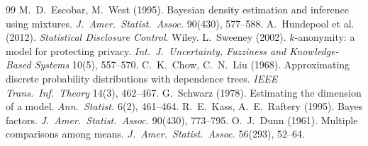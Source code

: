 \documentclass[11pt,a4paper]{article}
\theoremstyle{definition}
\theoremstyle{remark}
\begin{document}
\begin{thebibliography}{99}
 M.~D.~Escobar, M.~West (1995). Bayesian density estimation and inference using mixtures. \emph{J.\ Amer.\ Statist.\ Assoc.} 90(430), 577--588.
 A.~Hundepool et al. (2012). \emph{Statistical Disclosure Control}. Wiley.
 L.~Sweeney (2002). $k$-anonymity: a model for protecting privacy. \emph{Int.\ J.\ Uncertainty, Fuzziness and Knowledge-Based Systems} 10(5), 557--570.
 C.~K.~Chow, C.~N.~Liu (1968). Approximating discrete probability distributions with dependence trees. \emph{IEEE Trans.\ Inf.\ Theory} 14(3), 462--467.
 G.~Schwarz (1978). Estimating the dimension of a model. \emph{Ann.\ Statist.} 6(2), 461--464.
 R.~E.~Kass, A.~E.~Raftery (1995). Bayes factors. \emph{J.\ Amer.\ Statist.\ Assoc.} 90(430), 773--795.
 O.~J.~Dunn (1961). Multiple comparisons among means. \emph{J.\ Amer.\ Statist.\ Assoc.} 56(293), 52--64.
\end{thebibliography}
\end{document}
